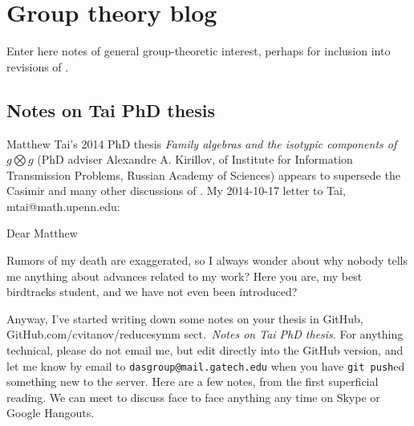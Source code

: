 
\chapter{Group theory blog}
\label{c-groupThe}


Enter here notes of general group-theoretic interest, perhaps
for inclusion into revisions of \wwwgt.

\section{Notes on Tai PhD thesis}
\label{s-groupTheBlog}

{Matthew Tai}'s 2014 PhD thesis
{\em Family algebras and the isotypic components of $g \bigotimes g$}
(PhD adviser
{Alexandre A. Kirillov}, of
 Institute for Information Transmission Problems, Russian Academy of Sciences)
appears to supersede the Casimir and many other discussions of {\wwwgt}.
My 2014-10-17 letter to Tai, mtai@math.upenn.edu:

Dear Matthew

Rumors of my death are exaggerated, so I always wonder about why nobody
tells me anything about advances related to my work? Here you are, my
best birdtracks student, and we have not even been introduced?

Anyway, I've started writing down some notes on your thesis in GitHub,
\\
{GitHub.com/cvitanov/reducesymm}
sect.~{\em Notes on Tai PhD thesis}. For anything technical, please do
not email me, but edit directly into the GitHub version, and let me know
by email to \texttt{dasgroup@mail.gatech.edu} when you have \texttt{git
push}ed something new to the server. Here are a few notes, from the first
superficial reading. We can meet to discuss face to face anything any
time on Skype or Google Hangouts.


